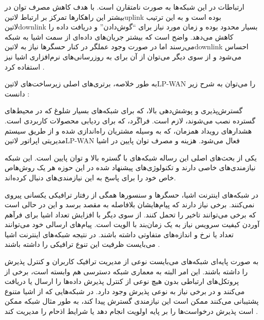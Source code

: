 ارتباطات در این شبکه‌ها به صورت نامتقارن است. با هدف کاهش مصرف توان در بیشتر این راهکارها تمرکز بر ارتباط ‌لاتین{uplink}
بوده است و به این ترتیب ‌لاتین{downlink} بسیار محدود بوده و زمان مورد نیاز برای ``گوش‌دادن'' و دریافت داده را کاهش می‌دهد.
واضح است که بیشتر جریان‌های داده‌ای از سمت اشیا به شبکه می‌رسند اما در صورت وجود عملگر در کنار حسگرها نیاز به ‌لاتین{downlink}
احساس می‌شود و از سوی دیگر می‌توان از آن برای به روزرسانی‌های نرم‌افزاری اشیا نیز استفاده کرد
.

به طور خلاصه، برتری‌های اصلی زیرساخت‌های ‌لاتین{LP-WAN} را می‌توان به شرح زیر دانست :

 گسترش‌پذیری و پوشش‌دهی بالا، که برای شبکه‌های بسیار شلوغ که در محیط‌های گسترده نصب می‌شوند، لازم است.
 فراگَرد، که برای ردیابی محصولات کاربردی است.
 هشدارهای رویداد همزمان، که به وسیله مشتریان راه‌اندازی شده و از طریق سیستم مدیریتی اپراتور ‌لاتین{LP-WAN} فعال می‌شود.
 هزینه و مصرف توان پایین در اشیا



یکی از بحث‌های اصلی این رساله شبکه‌های با گستره بالا و توان پایین است. این شبکه نیازمندی‌های خاصی دارند و تکنولوژی‌های پیشنهاد شده در این حوزه
هر یک روش‌هاص خاص خود را برای پاسخ به این نیازمندی‌های دنبال کرده‌اند.


در شبکه‌های اینترنت اشیا، حسگرها و سنسورها همگی از رفتار ترافیکی یکسانی پیروی نمی‌کنند. برخی نیاز دارند که پیام‌هایشان بلافاصله به مقصد برسد و این در حالی است که برخی می‌توانند تاخیر را تحمل کنند.
از سوی دیگر با افزایش تعداد اشیا برای فرآهم آوردن کیفیت سرویس نیاز به یک زمان‌بند با الویت است. پیام‌های ارسالی خود می‌توانند تعداد یا نرخ و اندازه‌های متفاوتی داشته باشند.
در نتیجه شبکه‌های اینترنت اشیا می‌بایست ظرفیت این تنوع ترافیکی را داشته باشند
.

به صورت پایه‌ای شبکه‌های می‌بایست نوعی از مدیریت ترافیک کاربران و کنترل پذیرش را داشته باشند.
این امر البته به معماری شبکه دسترسی هم وابسته است، برخی از پروتکل‌های ارتباطی بدون هیچ نوعی از کنترل پذیرش
داده‌ها را ارسال یا دریافت می‌کنند و در برخی نیاز به نوعی پذیرش وجود دارد.
در شبکه‌هایی که از اشیا متنوع پشتیبانی می‌کنند ممکن است این نیازمندی گسترش پیدا کند، به طور مثال
شبکه ممکن است پذیرش درخواست‌ها را بر پایه اولویت انجام دهد یا شرایط اذحام را مدیریت کند
.


